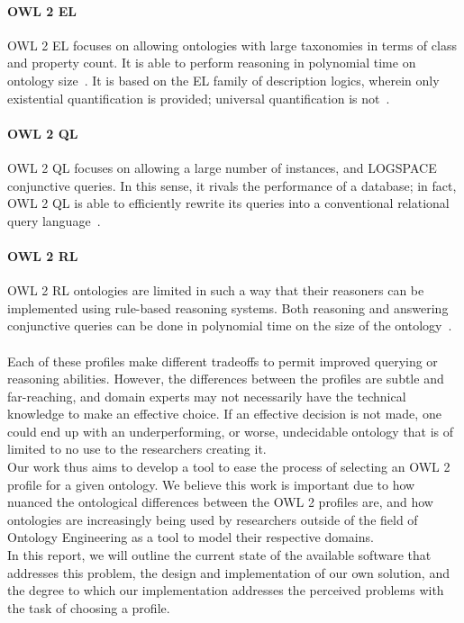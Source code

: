 \documentclass[a4paper,titlepage,11pt]{scrartcl}
\begin{document}
\paragraph{OWL 2 EL}
OWL 2 EL focuses on allowing ontologies with large taxonomies in terms of class and property count. It is able to perform reasoning in polynomial time on ontology size~\cite{w3owl2profiles}. It is based on the EL family of description logics, wherein only existential quantification is provided; universal quantification is not~\cite{w3owl2profiles}.
\paragraph{OWL 2 QL}
OWL 2 QL focuses on allowing a large number of instances, and LOGSPACE conjunctive queries. In this sense, it rivals the performance of a database; in fact, OWL 2 QL is able to efficiently rewrite its queries into a conventional relational query language~\cite{w3owl2profiles}.
\paragraph{OWL 2 RL}
OWL 2 RL ontologies are limited in such a way that their reasoners can be implemented using rule-based reasoning systems. Both reasoning and answering conjunctive queries can be done in polynomial time on the size of the ontology~\cite{w3owl2profiles}.
\paragraph{}
Each of these profiles make different tradeoffs to permit improved querying or reasoning abilities. However, the differences between the profiles are subtle and far-reaching, and domain experts may not necessarily have the technical knowledge to make an effective choice. If an effective decision is not made, one could end up with an underperforming, or worse, undecidable ontology that is of limited to no use to the researchers creating it.\\

Our work thus aims to develop a tool to ease the process of selecting an OWL 2 profile for a given ontology. We believe this work is important due to how nuanced the ontological differences between the OWL 2 profiles are, and how ontologies are increasingly being used by researchers outside of the field of Ontology Engineering as a tool to model their respective domains.\\

In this report, we will outline the current state of the available software that addresses this problem, the design and implementation of our own solution, and the degree to which our implementation addresses the perceived problems with the task of choosing a profile.
\end{document}
